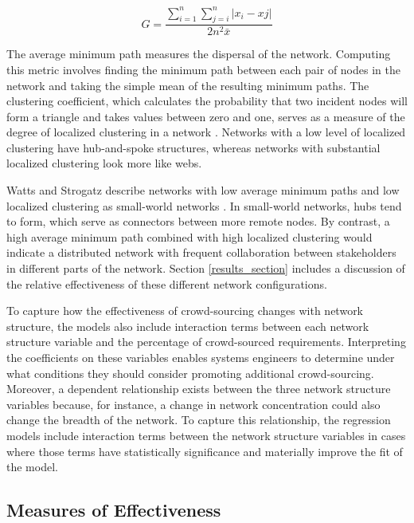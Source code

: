 \begin{equation}
\label{gini_coef}
    G = \frac{\sum_{i=1}^{n} \sum_{j=i}^{n} | x_{i} - x{j} |}{2n^2 \bar{x}}
\end{equation}

The average minimum path measures the dispersal of the network. Computing this metric involves finding the minimum path between each pair of nodes in the network and taking the simple mean of the resulting minimum paths. The clustering coefficient, which calculates the probability that two incident nodes will form a triangle and takes values between zero and one, serves as a measure of the degree of localized clustering in a network \cite{holland}. Networks with a low level of localized clustering have hub-and-spoke structures, whereas networks with substantial localized clustering look more like webs.

Watts and Strogatz describe networks with low average minimum paths and low localized clustering as small-world networks \cite{watts}. In small-world networks, hubs tend to form, which serve as connectors between more remote nodes. By contrast, a high average minimum path combined with high localized clustering would indicate a distributed network with frequent collaboration between stakeholders in different parts of the network. Section \ref{results_section} includes a discussion of the relative effectiveness of these different network configurations.

To capture how the effectiveness of crowd-sourcing changes with network structure, the models also include interaction terms between each network structure variable and the percentage of crowd-sourced requirements. Interpreting the coefficients on these variables enables systems engineers to determine under what conditions they should consider promoting additional crowd-sourcing. Moreover, a dependent relationship exists between the three network structure variables because, for instance, a change in network concentration could also change the breadth of the network. To capture this relationship, the regression models include interaction terms between the network structure variables in cases where those terms have statistically significance and materially improve the fit of the model.

\subsection{Measures of Effectiveness}
\label{measures_of_effectiveness}

